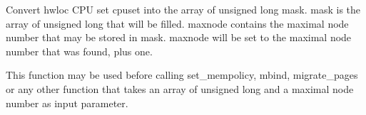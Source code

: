 Convert hwloc CPU set {\ttfamily cpuset} into the array of unsigned long {\ttfamily mask}. {\ttfamily mask} is the array of unsigned long that will be filled. {\ttfamily maxnode} contains the maximal node number that may be stored in {\ttfamily mask}. {\ttfamily maxnode} will be set to the maximal node number that was found, plus one.

This function may be used before calling set\_\-mempolicy, mbind, migrate\_\-pages or any other function that takes an array of unsigned long and a maximal node number as input parameter. 
